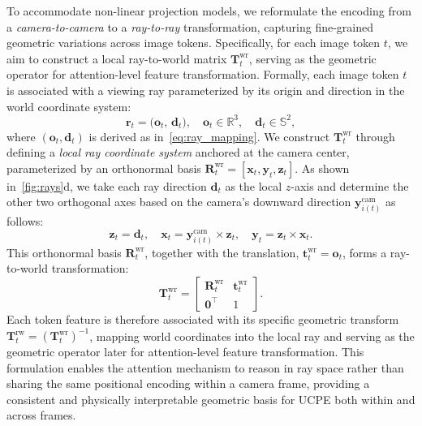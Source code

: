 To accommodate non-linear projection models, we reformulate the encoding from a \emph{camera-to-camera} to a \emph{ray-to-ray} transformation, capturing fine-grained geometric variations across image tokens.
Specifically, for each image token $t$, we aim to construct a local ray-to-world matrix $\mathbf{T}^{\textrm{wr}}_t$, serving as the geometric operator for attention-level feature transformation.
Formally, each image token \(t\) is associated with a viewing ray parameterized by its origin and direction in the world coordinate system:
\begin{equation}
\bm{r}_t = \big(\bm{o}_t,\, \bm{d}_t\big),
\quad
\bm{o}_t \in \mathbb{R}^3,
\quad
\bm{d}_t \in \mathbb{S}^2,
\label{eq:ray_def}
\end{equation}
where \((\bm{o}_t, \bm{d}_t)\) is derived as in~\cref{eq:ray_mapping}.
We construct $\mathbf{T}^{\textrm{wr}}_t$ through defining a \emph{local ray coordinate system} anchored at the camera center, parameterized by an orthonormal basis \(\mathbf{R}^{\textrm{wr}}_t = [\mathbf{x}_t,\mathbf{y}_t,\mathbf{z}_t]\). As shown in~\cref{fig:rays}d, we take each ray direction $\mathbf{d}_t$ as the local $z$-axis and determine the other two orthogonal axes based on the camera's downward direction \(\mathbf{y}^{\textrm{cam}}_{i(t)}\) as follows:
\begin{equation}
\bm{z}_t = \bm{d}_t,
\quad
\bm{x}_t = \bm{y}^{\textrm{cam}}_{i(t)} \times \bm{z}_t,
\quad
\bm{y}_t = \bm{z}_t \times \bm{x}_t.
\label{eq:ray_axes}
\end{equation}
This orthonormal basis \(\mathbf{R}^{\textrm{wr}}_t\), together with the translation, \(\mathbf{t}^{\textrm{wr}}_t=\mathbf{o}_t\), forms a ray-to-world transformation:
\begin{equation}
\mathbf{T}^{\textrm{wr}}_t =
\begin{bmatrix}
\mathbf{R}^{\textrm{wr}}_t & \bm{t}^{\textrm{wr}}_t \\
\mathbf{0}^\top & 1
\end{bmatrix}.
\label{eq:ray2world}
\end{equation}
Each token feature is therefore associated with its specific geometric transform \(\mathbf{T}^{\textrm{rw}}_t = (\mathbf{T}^{\textrm{wr}}_t)^{-1}\),
mapping world coordinates into the local ray and serving as the geometric operator later for attention-level feature transformation. %
This formulation enables the attention mechanism to reason in ray space rather than sharing the same positional encoding within a camera frame, providing a consistent and physically interpretable geometric basis for UCPE both within and across frames.

